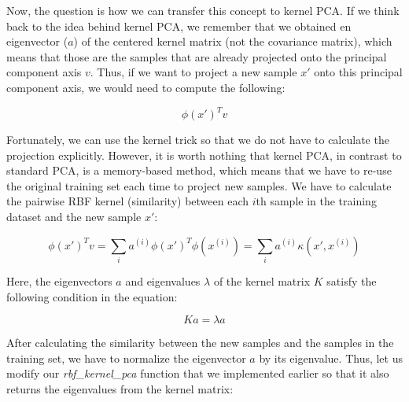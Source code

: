 \documentclass[11pt]{article}
\begin{document}
Now, the question is how we can transfer this concept to kernel PCA. If
we think back to the idea behind kernel PCA, we remember that we
obtained en eigenvector (\(a\)) of the centered kernel matrix (not the
covariance matrix), which means that those are the samples that are
already projected onto the principal component axis \(v\). Thus, if we
want to project a new sample \(x'\) onto this principal component axis,
we would need to compute the following:

\[\phi(x')^T v\]

Fortunately, we can use the kernel trick so that we do not have to
calculate the projection explicitly. However, it is worth nothing that
kernel PCA, in contrast to standard PCA, is a memory-based method, which
means that we have to re-use the original training set each time to
project new samples. We have to calculate the pairwise RBF kernel
(similarity) between each \(i\)th sample in the training dataset and the
new sample \(x'\):

\[\phi(x')^T v = \sum_{i} a^{(i)} \phi(x')^T \phi(x^{(i)}) = \sum_{i} a^{(i)} \kappa(x', x^{(i)})\]

Here, the eigenvectors \(a\) and eigenvalues \(\lambda\) of the kernel
matrix \(K\) satisfy the following condition in the equation:

\[Ka = \lambda a\]

After calculating the similarity between the new samples and the samples
in the training set, we have to normalize the eigenvector \(a\) by its
eigenvalue. Thus, let us modify our \emph{rbf\_kernel\_pca} function
that we implemented earlier so that it also returns the eigenvalues from
the kernel matrix:
\end{document}
